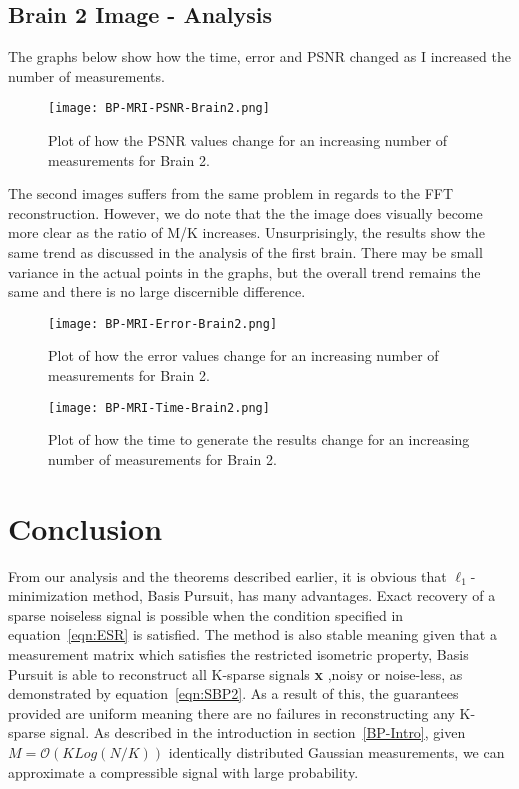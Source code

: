\documentclass[titlepage,oneside, 12pt]{book}
\theoremstyle{break}
\begin{document}
\subsection{Brain 2 Image - Analysis}

The graphs below show how the time, error and PSNR changed as I increased the number of measurements. 

\begin{figure}[H]
\centering
\centerline{\texttt{[image: BP-MRI-PSNR-Brain2.png]}}
\caption{Plot of how the PSNR values change for an increasing number of measurements for Brain 2.}
\label{fig:BP-MRI-PSNR-Brain2}
\end{figure}

The second images suffers from the same problem in regards to the FFT reconstruction. However, we do note that the the image does visually become more clear as the ratio of M/K increases. 
Unsurprisingly, the results show the same trend as discussed in the analysis of the first brain. There may be small variance in the actual points in the graphs, but the overall trend remains the same and there is no large discernible difference. 


\begin{figure}[H]
\centering
\centerline{\texttt{[image: BP-MRI-Error-Brain2.png]}}
\caption{Plot of how the error values change for an increasing number of measurements for Brain 2.}
\label{fig:BP-MRI-Error-Brain2}
\end{figure}

\begin{figure}[H]
\centering
\centerline{\texttt{[image: BP-MRI-Time-Brain2.png]}}
\caption{Plot of how the time to generate the results change for an increasing number of measurements for Brain 2.}
\label{fig:BP-MRI-Time-Brain2}
\end{figure}

\clearpage

\section{Conclusion}

From our analysis and the theorems described earlier, it is obvious that $\ell_1$-minimization method, Basis Pursuit, has many advantages. Exact recovery of a sparse noiseless signal is possible when the condition specified in equation~\ref{eqn:ESR} is satisfied.  The method is also stable meaning given that a measurement matrix which satisfies the restricted isometric property, Basis Pursuit is able to reconstruct all K-sparse signals \textbf{x} ,noisy or noise-less, as demonstrated by equation~\ref{eqn:SBP2}. As a result of this, the guarantees provided are uniform meaning there are no failures in reconstructing any K-sparse signal. As described in the introduction in section~\ref{BP-Intro}, given  $M = \mathcal{O}(KLog(N/K))$ identically distributed Gaussian measurements, we can approximate a compressible signal with large probability.
\end{document}
